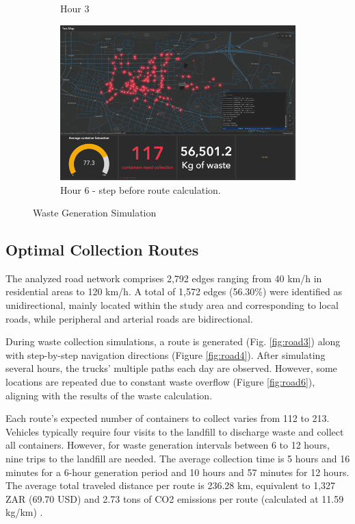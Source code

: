 \documentclass[authoryear,preprint,review,doubleblind, 12pt]{elsarticle}
\begin{document}
\begin{figure}[h!]
\begin{subfigure}[b]{0.45\linewidth}
        \caption{Hour 3}
    \end{subfigure}
    \begin{subfigure}[b]{0.45\linewidth}
        \includegraphics[width=\linewidth]{Figures/Sim6.png}
        \caption{Hour 6 - step before route calculation.}
    \end{subfigure}
    \caption{Waste Generation Simulation}
        \label{fig:Sim1}
    \end{figure}

    \subsection{Optimal Collection Routes}\label{subs:Optimalroute}
    
    The analyzed road network comprises 2,792 edges ranging from 40 km/h in residential areas to 120 km/h. A total of 1,572 edges (56.30\%) were identified as unidirectional, mainly located within the study area and corresponding to local roads, while peripheral and arterial roads are bidirectional.

        During waste collection simulations, a route is generated (Fig. \ref{fig:road3}) along with step-by-step navigation directions (Figure \ref{fig:road4}). After simulating several hours, the trucks' multiple paths each day are observed. However, some locations are repeated due to constant waste overflow (Figure \ref{fig:road6}),  aligning with the results of the waste calculation.

        Each route's expected number of containers to collect varies from 112 to 213. Vehicles typically require four visits to the landfill to discharge waste and collect all containers. However, for waste generation intervals between 6 to 12 hours, nine trips to the landfill are needed. The average collection time is 5 hours and 16 minutes for a 6-hour generation period and 10 hours and 57 minutes for 12 hours. The average total traveled distance per route is 236.28 km, equivalent to 1,327 ZAR (69.70 USD) and 2.73 tons of CO2 emissions per route (calculated at 11.59 kg/km) \citep{EPA2023}.
\end{document}
